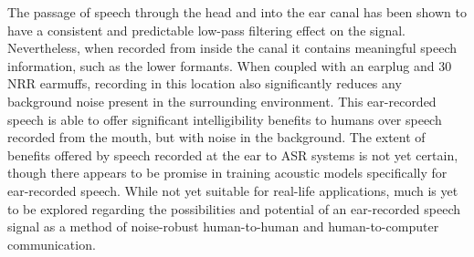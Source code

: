 The passage of speech through the head and into the ear canal has been shown to have a consistent and predictable low-pass filtering effect on the signal.  Nevertheless, when recorded from inside the canal it contains meaningful speech information, such as the lower formants.  When coupled with an earplug and 30 NRR earmuffs, recording in this location also significantly reduces any background noise present in the surrounding environment.  This ear-recorded speech is able to offer significant intelligibility benefits to humans over speech recorded from the mouth, but with noise in the background.  The extent of benefits offered by speech recorded at the ear to ASR systems is not yet certain, though there appears to be promise in training acoustic models specifically for ear-recorded speech. While not yet suitable for real-life applications, much is yet to be explored regarding the possibilities and potential of an ear-recorded speech signal as a method of noise-robust human-to-human and human-to-computer communication.





